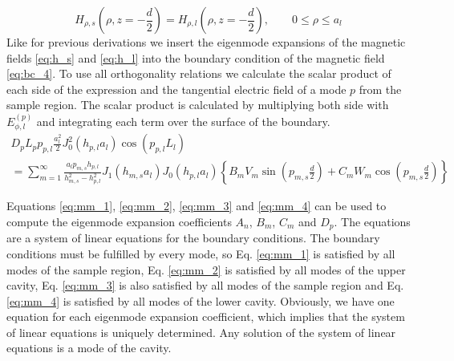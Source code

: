 \begin{equation}\label{eq:bc_4}
H_{\rho,s}\left(\rho,z=-\frac{d}{2}\right)= H_{\rho,l}\left(\rho,z=-\frac{d}{2}\right),\qquad 0\leq\rho\leq a_l
\end{equation}
Like for previous derivations we insert the eigenmode expansions of the magnetic fields \eqref{eq:h_s} and \eqref{eq:h_l} into the boundary condition of the magnetic field \eqref{eq:bc_4}. To use all orthogonality relations we calculate the scalar product of each side of the expression and the tangential electric field of a mode $p$ from the sample region. The scalar product is calculated by multiplying both side with $E_{\phi,l}^{(p)}$ and integrating each term over the surface of the boundary.
\begin{gather}
D_pL_pp_{p,l}\frac{a_l^2}{2}J_0^2(h_{p,l}a_l)\cos(p_{p,l}L_l)\nonumber\\=\sum\limits_{m=1}^\infty\frac{a_lp_{m,s}h_{p,l}}{h_{m,s}^2-h_{p,l}^2}J_1(h_{m,s}a_l)J_0(h_{p,l}a_l)\left\{B_mV_m\sin(p_{m,s}\frac{d}{2})+C_mW_m\cos(p_{m,s}\frac{d}{2})\right\}\label{eq:mm_4}
\end{gather}

Equations \eqref{eq:mm_1}, \eqref{eq:mm_2}, \eqref{eq:mm_3} and \eqref{eq:mm_4} can be used to compute the eigenmode expansion coefficients $A_n$, $B_m$, $C_m$ and $D_p$. The equations are a system of linear equations for the boundary conditions. The boundary conditions must be fulfilled by every mode, so Eq. \eqref{eq:mm_1} is satisfied by all modes of the sample region, Eq. \eqref{eq:mm_2} is satisfied by all modes of the upper cavity, Eq. \eqref{eq:mm_3} is also satisfied by all modes of the sample region and Eq. \eqref{eq:mm_4} is satisfied by all modes of the lower cavity. Obviously, we have one equation for each eigenmode expansion coefficient, which implies that the system of linear equations is uniquely determined. Any solution of the system of linear equations is a mode of the cavity.


